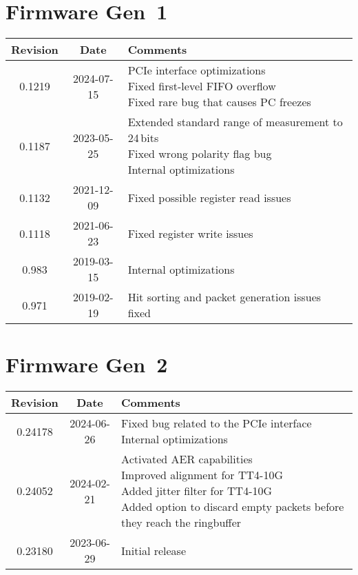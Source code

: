 \section{Firmware Gen~1}
\begin{tabularx}{\textwidth}{|c|c|X|}
    \hline
    Revision & Date & Comments\\
    \hline\hline
    \hypertarget{fwrev}{0.1219} & 2024-07-15 & 
    \makecell[l] {
        PCIe interface optimizations\\*
        Fixed first-level FIFO overflow\\*
        Fixed rare bug that causes PC freezes\\*
    }\\
    \hline
    0.1187 & 2023-05-25 & 
    \makecell[l] {
        Extended standard range of measurement to 24\,bits\\*
        Fixed wrong polarity flag bug\\*
        Internal optimizations
    }\\
    \hline
    0.1132 & 2021-12-09 & Fixed possible register read issues\\
    \hline
	0.1118 & 2021-06-23 & Fixed register write issues\\
    \hline
    0.983 & 2019-03-15 & Internal optimizations\\
    \hline
    0.971 & 2019-02-19 & Hit sorting and packet generation issues fixed\\
    \hline
\end{tabularx}

\section{Firmware Gen~2}
\begin{tabularx}{\textwidth}{|c|c|X|}
    \hline
    Revision & Date & Comments\\
    \hline\hline
    0.24178 & 2024-06-26 &
    \makecell[l]{
        Fixed bug related to the PCIe interface\\*
        Internal optimizations\\*
    }\\
    \hline
    0.24052 & 2024-02-21 &
    \makecell[l]{
        Activated AER capabilities\\*
        Improved alignment for TT4-10G\\*
        Added jitter filter for TT4-10G\\*
        Added option to discard empty packets before they reach the ringbuffer\\*
    }\\
    \hline
    0.23180 & 2023-06-29 & Initial release\\ 
    \hline
\end{tabularx}